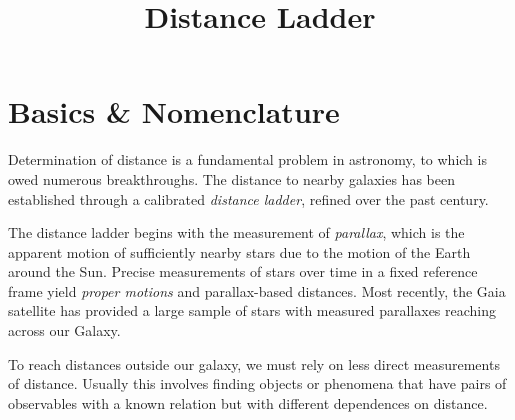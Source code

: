 \title{\bf Distance Ladder}

\section{Basics \& Nomenclature}

Determination of distance is a fundamental problem in astronomy, to
which is owed numerous breakthroughs. The distance to nearby galaxies
has been established through a calibrated {\it distance ladder},
refined over the past century.

The distance ladder begins with the measurement of {\it parallax},
which is the apparent motion of sufficiently nearby stars due to the
motion of the Earth around the Sun. Precise measurements of stars over
time in a fixed reference frame yield {\it proper motions} and
parallax-based distances. Most recently, the Gaia satellite has
provided a large sample of stars with measured parallaxes reaching
across our Galaxy.

To reach distances outside our galaxy, we must rely on less direct
measurements of distance. Usually this involves finding objects or
phenomena that have pairs of observables with a known relation but
with different dependences on distance.

